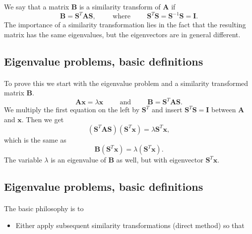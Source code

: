 We say that a matrix $\mathbf{B}$ is a similarity
transform  of  $\mathbf{A}$ if 
\[
     \mathbf{B}= \mathbf{S}^T \mathbf{A}\mathbf{S}, \hspace{1cm} \mathrm{where} \hspace{1cm}  \mathbf{S}^T\mathbf{S}=\mathbf{S}^{-1}\mathbf{S} =\mathbf{I}.
\]
The importance of a similarity transformation lies in the fact that
the resulting matrix has the same
eigenvalues, but the eigenvectors are in general different.



\subsection*{Eigenvalue problems, basic definitions}

\paragraph{}
To prove this we
start with  the eigenvalue problem and a similarity transformed matrix $\mathbf{B}$.
\[
   \mathbf{A}\mathbf{x}=\lambda\mathbf{x} \hspace{1cm} \mathrm{and}\hspace{1cm} 
    \mathbf{B}= \mathbf{S}^T \mathbf{A}\mathbf{S}.
\]
We multiply the first equation on the left by $\mathbf{S}^T$ and insert
$\mathbf{S}^{T}\mathbf{S} = \mathbf{I}$ between $\mathbf{A}$ and $\mathbf{x}$. Then we get
\begin{equation}
   (\mathbf{S}^T\mathbf{A}\mathbf{S})(\mathbf{S}^T\mathbf{x})=\lambda\mathbf{S}^T\mathbf{x} ,
\end{equation}  
which is the same as 
\[
   \mathbf{B} \left ( \mathbf{S}^T\mathbf{x} \right ) = \lambda \left (\mathbf{S}^T\mathbf{x}\right ).
\]
The variable  $\lambda$ is an eigenvalue of $\mathbf{B}$ as well, but with
eigenvector $\mathbf{S}^T\mathbf{x}$.



\subsection*{Eigenvalue problems, basic definitions}

\paragraph{}
The basic philosophy is to
\begin{itemize}
 \item Either apply subsequent similarity transformations (direct method) so that 
\end{itemize}

